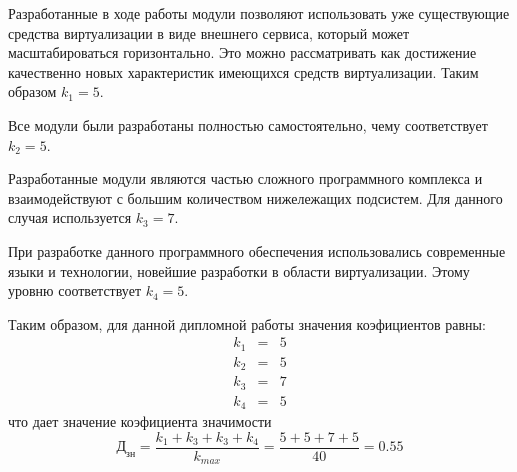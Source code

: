 Разработанные в ходе работы модули позволяют использовать уже существующие средства
виртуализации в виде внешнего сервиса, который может масштабироваться горизонтально. Это можно рассматривать как достижение качественно новых характеристик имеющихся средств
виртуализации. Таким образом $ k_1 = 5$.

Все модули были разработаны полностью самостоятельно, чему соответствует $k_2 = 5$.

Разработанные модули являются частью сложного программного комплекса и взаимодействуют
с большим количеством нижележащих подсистем. Для данного случая используется $k_3 = 7$.

При разработке данного программного обеспечения использовались современные языки и 
технологии, новейшие разработки в области виртуализации. Этому уровню соответствует $k_4 = 5$.

Таким образом, для данной дипломной работы значения коэфициентов равны:
\begin{eqnarray}
    k_1 &=& 5\nonumber \\
    k_2 &=& 5\nonumber \\
    k_3 &=& 7\nonumber \\
    k_4 &=& 5\nonumber 
\end{eqnarray}
что дает значение коэфициента значимости
\begin{equation}
  Д_{зн} = \frac{k_1 + k_3 + k_3 + k_4}{k_{max}} = \frac{5 + 5 + 7 + 5}{40} = 0.55
\end{equation}